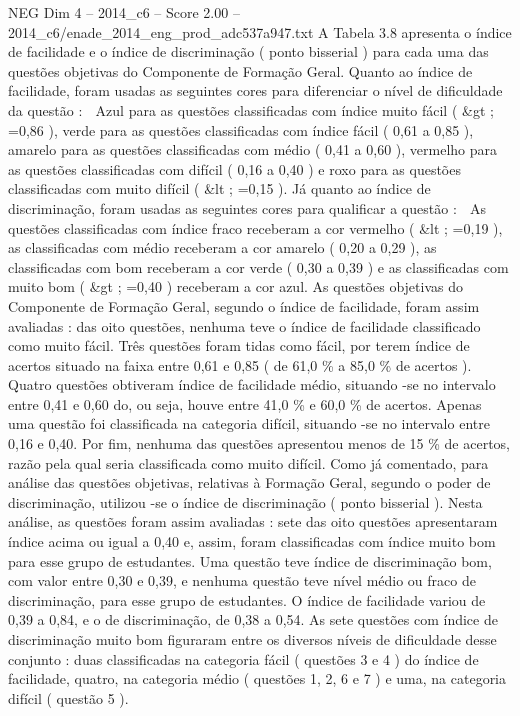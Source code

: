\begin{textsample}{NEG Dim 4 – 2014\_c6 – Score 2.00 – 2014\_c6/enade\_2014\_eng\_prod\_adc537a947.txt}
A Tabela 3.8 apresenta o índice de facilidade e o índice de discriminação ( ponto bisserial ) para cada uma das questões objetivas do Componente de Formação Geral.
Quanto ao índice de facilidade, foram usadas as seguintes cores para diferenciar o nível de dificuldade da questão :  Azul para as questões classificadas com índice muito fácil ( \&gt ; =0,86 ), verde para as questões classificadas com índice fácil ( 0,61 a 0,85 ), amarelo para as questões classificadas com médio ( 0,41 a 0,60 ), vermelho para as questões classificadas com difícil ( 0,16 a 0,40 ) e roxo para as questões classificadas com muito difícil ( \&lt ; =0,15 ).
Já quanto ao índice de discriminação, foram usadas as seguintes cores para qualificar a questão :  As questões classificadas com índice fraco receberam a cor vermelho ( \&lt ; =0,19 ), as classificadas com médio receberam a cor amarelo ( 0,20 a 0,29 ), as classificadas com bom receberam a cor verde ( 0,30 a 0,39 ) e as classificadas com muito bom ( \&gt ; =0,40 ) receberam a cor azul.
As questões objetivas do Componente de Formação Geral, segundo o índice de facilidade, foram assim avaliadas : das oito questões, nenhuma teve o índice de facilidade classificado como muito fácil.
Três questões foram tidas como fácil, por terem índice de acertos situado na faixa entre 0,61 e 0,85 ( de 61,0 \% a 85,0 \% de acertos ).
Quatro questões obtiveram índice de facilidade médio, situando -se no intervalo entre 0,41 e 0,60 do, ou seja, houve entre 41,0 \% e 60,0 \% de acertos.
Apenas uma questão foi classificada na categoria difícil, situando -se no intervalo entre 0,16 e 0,40.
Por fim, nenhuma das questões apresentou menos de 15 \% de acertos, razão pela qual seria classificada como muito difícil.
Como já comentado, para análise das questões objetivas, relativas à Formação Geral, segundo o poder de discriminação, utilizou -se o índice de discriminação ( ponto bisserial ).
Nesta análise, as questões foram assim avaliadas : sete das oito questões apresentaram índice acima ou igual a 0,40 e, assim, foram classificadas com índice muito bom para esse grupo de estudantes.
Uma questão teve índice de discriminação bom, com valor entre 0,30 e 0,39, e nenhuma questão teve nível médio ou fraco de discriminação, para esse grupo de estudantes.
O índice de facilidade variou de 0,39 a 0,84, e o de discriminação, de 0,38 a 0,54.
As sete questões com índice de discriminação muito bom figuraram entre os diversos níveis de dificuldade desse conjunto : duas classificadas na categoria fácil ( questões 3 e 4 ) do índice de facilidade, quatro, na categoria médio ( questões 1, 2, 6 e 7 ) e uma, na categoria difícil ( questão 5 ).

\end{textsample}
